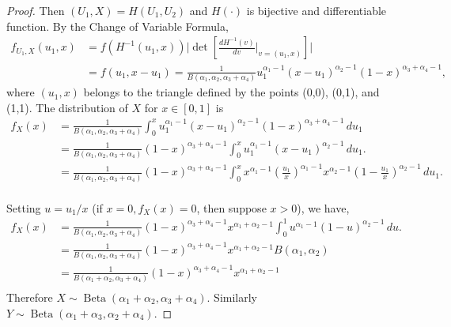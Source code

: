 \documentclass[a4paper, notitlepage, 11pt]{article}
\newcommand{\betadist}{\operatorname{Beta}}
\theoremstyle{definition}
\theoremstyle{remark}
\begin{document}
\begin{proof}
Then $(U_1, X) = H(U_1, U_2)$ and $H(\cdot)$ is bijective and differentiable function. By the Change of Variable Formula, 
\begin{equation}
  \begin{split}
    f_{U_1, X}(u_1, x) &= f({H^{-1}(u_1,x)})\bigg|\det\left[\frac{dH^{-1}(v)}{dv}\bigg|_{v=(u_1,x)}\right]\bigg| \\ 
    &= f(u_1, x - u_1) = \frac{1}{B(\alpha_1, \alpha_2, \alpha_3+\alpha_4)}u_1^{\alpha_1-1}(x-u_1)^{\alpha_2-1}(1-x)^{\alpha_3+\alpha_4-1}, 
  \end{split}
\end{equation}
where $(u_1, x)$ belongs to the triangle defined by the points (0,0),
(0,1), and (1,1). The distribution of $X$ for $x \in [0,1]$ is
\begin{equation}
  \begin{split}
    f_X(x) &= \frac{1}{B(\alpha_1, \alpha_2, \alpha_3+\alpha_4)}\int_{0}^{x} u_1^{\alpha_1-1}(x-u_1)^{\alpha_2-1}(1-x)^{\alpha_3+\alpha_4-1} \, du_1 \\
    &= \frac{1}{B(\alpha_1, \alpha_2, \alpha_3+\alpha_4)}(1-x)^{\alpha_3+\alpha_4-1} \int_{0}^{x} u_1^{\alpha_1-1}(x-u_1)^{\alpha_2-1} \, du_1. \\
    &= \frac{1}{B(\alpha_1, \alpha_2, \alpha_3+\alpha_4)}(1-x)^{\alpha_3+\alpha_4-1} \int_{0}^{x} x^{\alpha_1-1} \left(\frac{u_1}{x}\right)^{\alpha_1-1}x^{\alpha_2 - 1}\left(1-\frac{u_1}{x}\right)^{\alpha_2-1} \, du_1. \\
  \end{split}
\end{equation}

Setting $u = u_1/x$ (if $x = 0, f_X(x) = 0$, then suppose $x > 0$), we have, 
\begin{equation}
  \begin{split}
    f_X(x) &= \frac{1}{B(\alpha_1, \alpha_2, \alpha_3+\alpha_4)}(1-x)^{\alpha_3+\alpha_4-1} x^{\alpha_1+\alpha_2-1} \int_{0}^{1} u^{\alpha_1-1}(1-u)^{\alpha_2-1} \, du. \\
    &= \frac{1}{B(\alpha_1, \alpha_2, \alpha_3+\alpha_4)}(1-x)^{\alpha_3+\alpha_4-1} x^{\alpha_1+\alpha_2-1} B(\alpha_1, \alpha_2)\\
    &= \frac{1}{B(\alpha_1 + \alpha_2, \alpha_3+\alpha_4)}(1-x)^{\alpha_3+\alpha_4-1} x^{\alpha_1+\alpha_2-1}\\
  \end{split}
\end{equation}
Therefore $X \sim \betadist(\alpha_1+\alpha_2, \alpha_3+\alpha_4)$. Similarly $Y \sim \betadist(\alpha_1+\alpha_3, \alpha_2 + \alpha_4)$.

\end{proof}
\end{document}
